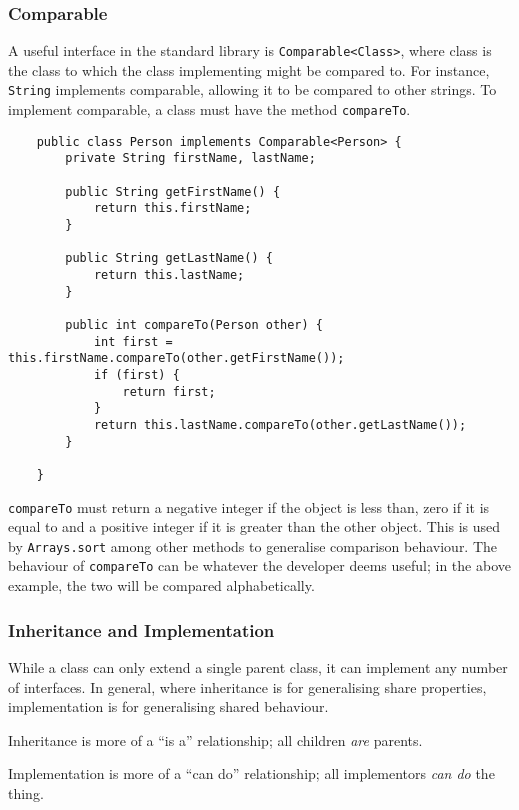 \documentclass[12pt]{report}
\newcommand{\code}[1]{\lstinline{#1}}
\begin{document}
\begin{flushleft}
\subsubsection*{Comparable}

A useful interface in the standard library is \code{Comparable<Class>}, where
class is the class to which the class implementing might be compared to. For
instance, \code{String} implements comparable, allowing it to be compared to
other strings. To implement comparable, a class must have the method
\code{compareTo}.

\begin{lstlisting}
    public class Person implements Comparable<Person> {
        private String firstName, lastName;

        public String getFirstName() {
            return this.firstName;
        }

        public String getLastName() {
            return this.lastName;
        }

        public int compareTo(Person other) {
            int first = this.firstName.compareTo(other.getFirstName());
            if (first) {
                return first;
            }
            return this.lastName.compareTo(other.getLastName());
        }
    
    } 
\end{lstlisting}

\code{compareTo} must return a negative integer if the object is less than,
zero if it is equal to and a positive integer if it is greater than the other
object. This is used by \code{Arrays.sort} among other methods to generalise
comparison behaviour. The behaviour of \code{compareTo} can be whatever the
developer deems useful; in the above example, the two will be compared
alphabetically.

\subsubsection*{Inheritance and Implementation}

While a class can only extend a single parent class, it can implement any
number of interfaces. In general, where inheritance is for generalising
share properties, implementation is for generalising shared behaviour. \par
Inheritance is more of a ``is a'' relationship; all children \textit{are}
parents. \par
Implementation is more of a ``can do'' relationship; all implementors
\textit{can do} the thing.


\end{flushleft}
\end{document}
